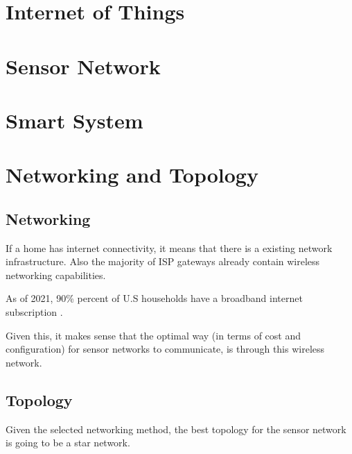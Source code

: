 \documentclass[journal]{IEEEtran} %
\begin{document}




\section{Internet of Things}


\section{Sensor Network}


\section{Smart System}


\section{Networking and Topology}

\subsection{Networking}

If a home has internet connectivity, it means that there is a existing network infrastructure.
Also the majority of ISP gateways already contain wireless networking capabilities.

As of 2021, 90\% percent of U.S households have a broadband internet subscription \cite{censusgov}.

Given this, it makes sense that the optimal way (in terms of cost and configuration) for sensor networks to communicate,
is through this wireless network.

\subsection{Topology}

Given the selected networking method, the best topology for the sensor network is going to be a star network.
\end{document}
